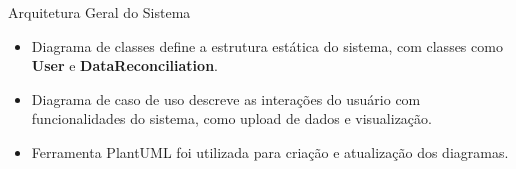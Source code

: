 \begin{frame}{Arquitetura Geral do Sistema}
    \begin{itemize}
        \item Diagrama de classes define a estrutura estática do sistema, com classes como \textbf{User} e \textbf{DataReconciliation}.
        \item Diagrama de caso de uso descreve as interações do usuário com funcionalidades do sistema, como upload de dados e visualização.
        \item Ferramenta PlantUML foi utilizada para criação e atualização dos diagramas.
    \end{itemize}
\end{frame}